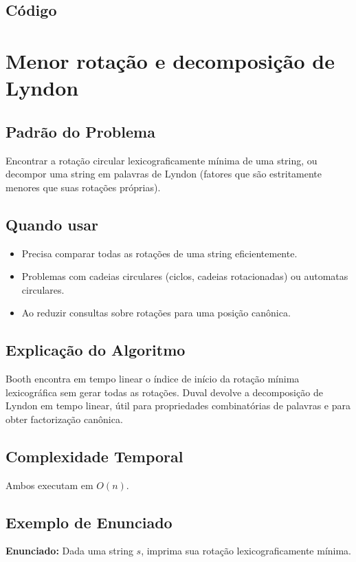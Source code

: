 \subsection{Código}

\section{Menor rotação e decomposição de Lyndon}

\subsection{Padrão do Problema}
Encontrar a rotação circular lexicograficamente mínima de uma string, ou decompor uma string em palavras de Lyndon (fatores que são estritamente menores que suas rotações próprias).

\subsection{Quando usar}
\begin{itemize}[nosep]
  \item Precisa comparar todas as rotações de uma string eficientemente.
  \item Problemas com cadeias circulares (ciclos, cadeias rotacionadas) ou automatas circulares.
  \item Ao reduzir consultas sobre rotações para uma posição canônica.
\end{itemize}

\subsection{Explicação do Algoritmo}
Booth encontra em tempo linear o índice de início da rotação mínima lexicográfica sem gerar todas as rotações. Duval devolve a decomposição de Lyndon em tempo linear, útil para propriedades combinatórias de palavras e para obter factorização canônica.

\subsection{Complexidade Temporal}
Ambos executam em $O(n)$.

\subsection{Exemplo de Enunciado}
\begin{exemplodiabox}
\textbf{Enunciado:} Dada uma string $s$, imprima sua rotação lexicograficamente mínima.
\end{exemplodiabox}

